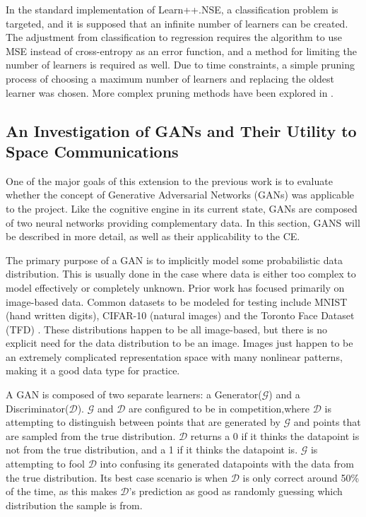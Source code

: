 	\par In the standard implementation of Learn++.NSE, a classification problem is targeted, and it is supposed that an infinite number of learners can be created. The adjustment from classification to regression requires the algorithm to use MSE instead of cross-entropy as an error function, and a method for limiting the number of learners is required as well. Due to time constraints, a simple pruning process of choosing a maximum number of learners and replacing the oldest learner was chosen. More complex pruning methods have been explored in \cite{margineantu1997pruning}.
	\clearpage
	\subsection {An Investigation of GANs and Their Utility to Space Communications}
	\par One of the major goals of this extension to the previous work is to evaluate whether the concept of Generative Adversarial Networks (GANs) \cite{gan_overview} was applicable to the project. Like the cognitive engine in its current state, GANs are composed of two neural networks providing complementary data. In this section, GANS will be described in more detail, as well as their applicability to the CE.  
	\par The primary purpose of a GAN is to implicitly model some probabilistic data distribution. This is usually done in the case where data is either too complex to model effectively or completely unknown. Prior work has focused primarily on image-based data. Common datasets to be modeled for testing include MNIST (hand written digits), CIFAR-10 (natural images) and the Toronto Face Dataset (TFD) \cite{gan_overview}. These distributions happen to be all image-based, but there is no explicit need for the data distribution to be an image. Images just happen to be an extremely complicated representation space with many nonlinear patterns, making it a good data type for practice.
	\par A GAN is composed of two separate learners: a Generator($\mathcal{G}$) and a Discriminator($\mathcal{D}$). $\mathcal{G}$ and $\mathcal{D}$ are configured to be in competition,where $\mathcal{D}$ is attempting to distinguish between points that are generated by $\mathcal{G}$ and points that are sampled from the true distribution. $\mathcal{D}$ returns a 0 if it thinks the datapoint is not from the true distribution, and a 1 if it thinks the datapoint is. $\mathcal{G}$ is attempting to fool $\mathcal{D}$ into confusing its generated datapoints with the data from the true distribution. Its best case scenario is when $\mathcal{D}$ is only correct around 50\% of the time, as this makes $\mathcal{D}$'s prediction as good as randomly guessing which distribution the sample is from.
